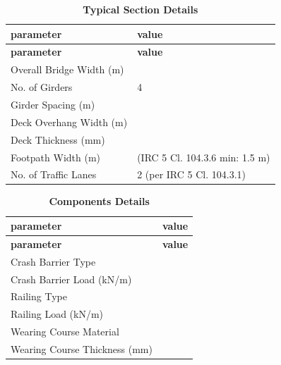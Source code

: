 \documentclass[12pt,a4paper]{report}
\numberwithin{table}{chapter}
\numberwithin{figure}{chapter}
\newcommand{\reportrowpad}{4pt}
\newcommand{\reportsectiongap}{0.75em}
\newcommand{\reportsmallgap}{0.4em}
\begin{document}
\begin{longtable}{|L{5.5cm}|p{10.0cm}|}
\caption{\textbf{Typical Section Details}}\\
\hline
\textbf{parameter} & \textbf{value} \\
\hline
\endfirsthead
\hline
\textbf{parameter} & \textbf{value} \\
\hline
\endhead
\textnormal{Overall Bridge Width (m)} &  \\[\reportrowpad]
\hline
\textnormal{No. of Girders} & 4 \\[\reportrowpad]
\hline
\textnormal{Girder Spacing (m)} &  \\[\reportrowpad]
\hline
\textnormal{Deck Overhang Width (m)} &  \\[\reportrowpad]
\hline
\textnormal{Deck Thickness (mm)} &  \\[\reportrowpad]
\hline
\textnormal{Footpath Width (m)} &  (IRC 5 Cl. 104.3.6 min: 1.5 m) \\[\reportrowpad]
\hline
\textnormal{No. of Traffic Lanes} & 2 (per IRC 5 Cl. 104.3.1) \\[\reportrowpad]
\hline
\end{longtable}

\vspace{\reportsectiongap}

\begin{longtable}{|L{5.5cm}|p{10.0cm}|}
\caption{\textbf{Components Details}}\\
\hline
\textbf{parameter} & \textbf{value} \\
\hline
\endfirsthead
\hline
\textbf{parameter} & \textbf{value} \\
\hline
\endhead
\textnormal{Crash Barrier Type} &  \\[\reportrowpad]
\hline
\textnormal{Crash Barrier Load (kN/m)} &  \\[\reportrowpad]
\hline

\textnormal{Railing Type} &  \\[\reportrowpad]
\hline
\textnormal{Railing Load (kN/m)} &  \\[\reportrowpad]
\hline
\textnormal{Wearing Course Material} &  \\[\reportrowpad]
\hline
\textnormal{Wearing Course Thickness (mm)} &  \\[\reportrowpad]
\hline
\end{longtable}


\newpage

\vspace{\reportsmallgap}
\noindent
\end{document}
